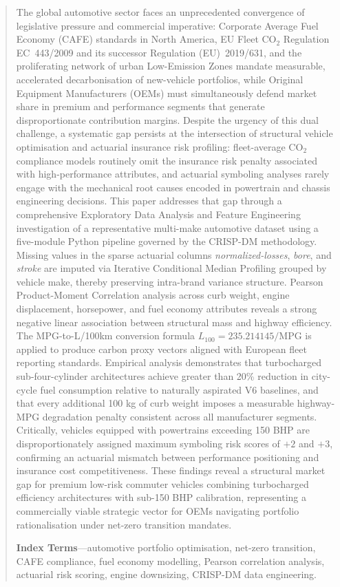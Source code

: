 \documentclass[conference]{IEEEtran}
\begin{document}
\begin{abstract}
The global automotive sector faces an unprecedented convergence of
legislative pressure and commercial imperative: Corporate Average Fuel
Economy (CAFE) standards in North America, EU Fleet CO$_2$ Regulation
EC~443/2009 and its successor Regulation (EU)~2019/631, and the
proliferating network of urban Low-Emission Zones mandate measurable,
accelerated decarbonisation of new-vehicle portfolios, while Original
Equipment Manufacturers (OEMs) must simultaneously defend market share
in premium and performance segments that generate disproportionate
contribution margins. Despite the urgency of this dual challenge, a
systematic gap persists at the intersection of structural vehicle
optimisation and actuarial insurance risk profiling: fleet-average CO$_2$
compliance models routinely omit the insurance risk penalty associated
with high-performance attributes, and actuarial symboling analyses
rarely engage with the mechanical root causes encoded in powertrain and
chassis engineering decisions. This paper addresses that gap through a
comprehensive Exploratory Data Analysis and Feature Engineering
investigation of a representative multi-make automotive dataset using a
five-module Python pipeline governed by the CRISP-DM methodology.
Missing values in the sparse actuarial columns \textit{normalized-losses},
\textit{bore}, and \textit{stroke} are imputed via Iterative Conditional
Median Profiling grouped by vehicle make, thereby preserving intra-brand
variance structure. Pearson Product-Moment Correlation analysis across
curb weight, engine displacement, horsepower, and fuel economy attributes
reveals a strong negative linear association between structural mass and
highway efficiency. The MPG-to-L/100km conversion formula
$L_{100} = 235.214145 / \mathrm{MPG}$ is applied to produce carbon proxy
vectors aligned with European fleet reporting standards. Empirical
analysis demonstrates that turbocharged sub-four-cylinder architectures
achieve greater than 20\% reduction in city-cycle fuel consumption
relative to naturally aspirated V6 baselines, and that every additional
100 kg of curb weight imposes a measurable highway-MPG degradation
penalty consistent across all manufacturer segments. Critically, vehicles
equipped with powertrains exceeding 150 BHP are disproportionately
assigned maximum symboling risk scores of $+2$ and $+3$, confirming
an actuarial mismatch between performance positioning and insurance cost
competitiveness. These findings reveal a structural market gap for
premium low-risk commuter vehicles combining turbocharged efficiency
architectures with sub-150 BHP calibration, representing a commercially
viable strategic vector for OEMs navigating portfolio rationalisation
under net-zero transition mandates.

\textbf{Index Terms}---automotive portfolio optimisation,
net-zero transition, CAFE compliance, fuel economy modelling,
Pearson correlation analysis, actuarial risk scoring, engine downsizing,
CRISP-DM data engineering.
\end{abstract}
\end{document}
